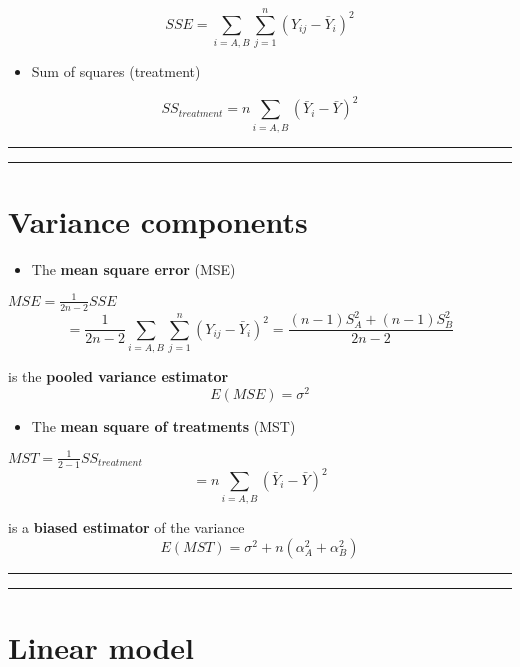 \documentclass[
]{book}
\providecommand{\tightlist}{%
  \setlength{\itemsep}{0pt}\setlength{\parskip}{0pt}}
\begin{document}
\[SSE=\sum_{i=A,B}\sum_{j=1}^n(Y_{ij}-\bar{Y}_i)^2\]

\begin{itemize}
\tightlist
\item
  Sum of squares (treatment)
\end{itemize}

\[SS_{treatment}=n\sum_{i=A,B}(\bar{Y}_{i}-\bar{Y})^2\]

\begin{center}\rule{0.5\linewidth}{0.5pt}\end{center}

\begin{center}\rule{0.5\linewidth}{0.5pt}\end{center}

\hypertarget{variance-components-2}{%
\section{Variance components}\label{variance-components-2}}

\begin{itemize}
\tightlist
\item
  The \textbf{mean square error} (MSE)
\end{itemize}

\(MSE=\frac{1}{2n-2} SSE\) \[= \frac{1}{2n-2} \sum_{i=A,B}\sum_{j=1}^n(Y_{ij}-\bar{Y}_i)^2= \frac{(n-1)S_A^2+(n-1)S_B^2}{2n-2}\]

is the \textbf{pooled variance estimator} \[E(MSE)=\sigma^2\]

\begin{itemize}
\tightlist
\item
  The \textbf{mean square of treatments} (MST)
\end{itemize}

\(MST=\frac{1}{2-1} SS_{treatment}\) \[ =  n\sum_{i=A,B}(\bar{Y}_{i}-\bar{Y})^2\]

is a \textbf{biased estimator} of the variance \[E(MST)=\sigma^2+n(\alpha_A^2+\alpha_B^2)\]

\begin{center}\rule{0.5\linewidth}{0.5pt}\end{center}

\begin{center}\rule{0.5\linewidth}{0.5pt}\end{center}

\hypertarget{linear-model-2}{%
\section{Linear model}\label{linear-model-2}}
\end{document}
